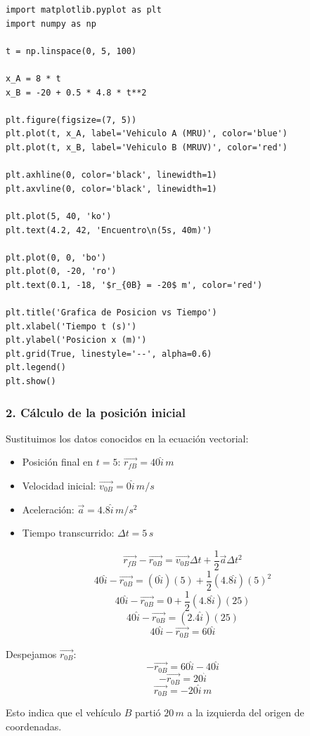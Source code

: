 \documentclass[12pt, a4paper]{article}
\begin{document}
\begin{lstlisting}
import matplotlib.pyplot as plt
import numpy as np

t = np.linspace(0, 5, 100)

x_A = 8 * t
x_B = -20 + 0.5 * 4.8 * t**2

plt.figure(figsize=(7, 5))
plt.plot(t, x_A, label='Vehiculo A (MRU)', color='blue')
plt.plot(t, x_B, label='Vehiculo B (MRUV)', color='red')

plt.axhline(0, color='black', linewidth=1)
plt.axvline(0, color='black', linewidth=1)

plt.plot(5, 40, 'ko')
plt.text(4.2, 42, 'Encuentro\n(5s, 40m)')

plt.plot(0, 0, 'bo')
plt.plot(0, -20, 'ro')
plt.text(0.1, -18, '$r_{0B} = -20$ m', color='red')

plt.title('Grafica de Posicion vs Tiempo')
plt.xlabel('Tiempo t (s)')
plt.ylabel('Posicion x (m)')
plt.grid(True, linestyle='--', alpha=0.6)
plt.legend()
plt.show()
\end{lstlisting}

\subsubsection*{2. Cálculo de la posición inicial}
Sustituimos los datos conocidos en la ecuación vectorial:
\begin{itemize}
    \item Posición final en $t=5$: $\vec{r_{fB}} = 40\hat{i} \, \si{m}$
    \item Velocidad inicial: $\vec{v_{0B}} = 0\hat{i} \, \si{m/s}$
    \item Aceleración: $\vec{a} = 4.8\hat{i} \, \si{m/s^2}$
    \item Tiempo transcurrido: $\Delta t = 5 \, \si{s}$
\end{itemize}

$$ \vec{r_{fB}} - \vec{r_{0B}} = \vec{v_{0B}} \Delta t + \frac{1}{2} \vec{a} \Delta t^2 $$
$$ 40\hat{i} - \vec{r_{0B}} = (0\hat{i})(5) + \frac{1}{2} (4.8\hat{i}) (5)^2 $$
$$ 40\hat{i} - \vec{r_{0B}} = 0 + \frac{1}{2} (4.8\hat{i}) (25) $$
$$ 40\hat{i} - \vec{r_{0B}} = (2.4\hat{i}) (25) $$
$$ 40\hat{i} - \vec{r_{0B}} = 60\hat{i} $$

Despejamos $\vec{r_{0B}}$:
$$ -\vec{r_{0B}} = 60\hat{i} - 40\hat{i} $$
$$ -\vec{r_{0B}} = 20\hat{i} $$
$$ \vec{r_{0B}} = -20\hat{i} \, \si{m} $$

Esto indica que el vehículo $B$ partió $20 \, \si{m}$ a la izquierda del origen de coordenadas.
\end{document}
